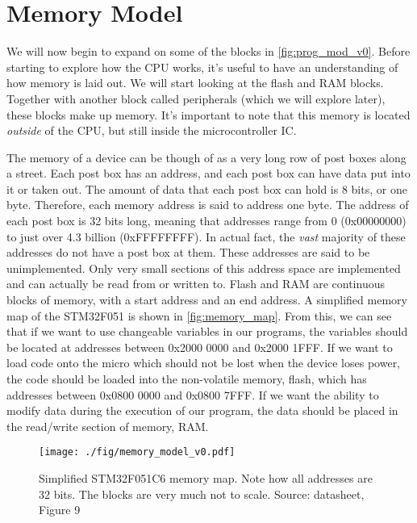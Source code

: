 \chapter{Memory Model}
We will now begin to expand on some of the blocks in \autoref{fig:prog_mod_v0}. Before starting to explore how the CPU works, it's useful to have an understanding of how memory is laid out. We will start looking at the flash and RAM blocks. Together with another block called peripherals (which we will explore later), these blocks make up memory. 
It's important to note that this memory is located \emph{outside} of the CPU, but still inside the microcontroller IC.

The memory of a device can be though of as a very long row of post boxes along a street. 
Each post box has an address, and each post box can have data put into it or taken out. The amount of data that each post box can hold is 8 bits, or one byte. Therefore, each memory address is said to address one byte. 
The address of each post box is 32 bits long, meaning that addresses range from 0 (0x00000000) to just over 4.3 billion (0xFFFFFFFF). In actual fact, the \emph{vast} majority of these addresses do not have a post box at them. These addresses are said to be unimplemented. 
Only very small sections of this address space are implemented and can actually be read from or written to.
Flash and RAM are continuous blocks of memory, with a start address and an end address. A simplified memory map of the STM32F051 is shown in \autoref{fig:memory_map}. From this, we can see that if we want to use changeable variables in our programs, the variables should be located at addresses between 0x2000 0000 and 0x2000 1FFF. If we want to load code onto the micro which should not be lost when the device loses power, the code should be loaded into the non-volatile memory, flash, which has addresses between 0x0800 0000 and 0x0800 7FFF.
If we want the ability to modify data during the execution of our program, the data should be placed in the read/write section of memory, RAM. 

\begin{figure}
  \centering
  \texttt{[image: ./fig/memory\_model\_v0.pdf]}
  \caption{Simplified STM32F051C6 memory map. Note how all addresses are 32 bits. The blocks are very much not to scale. Source: datasheet, Figure 9}
  \label{fig:memory_map}
\end{figure}

